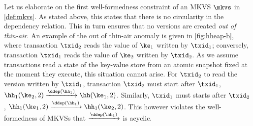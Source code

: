 
Let us elaborate on the first well-formedness constraint of an MKVS \( \mkvs \) in \cref{def:mkvs}. As stated above, this states that there is no circularity in the dependency relation.
This in turn ensures that no versions are created \emph{out of thin-air}.
An example of the out of thin-air anomaly is given in \cref{fig:hheap-b}, where
transaction $\txid_2$ reads the value of $\ke_1$ written by $\txid_1$;
conversely, transaction $\txid_1$ reads the value of $\ke_2$ written by $\txid_2$. 
As we assume transactions read a state of the key-value store from an atomic snapshot fixed at the moment they execute, this situation cannot arise. 
For $\txid_2$ to read the version written by $\txid_1$, transaction $\txid_2$ must start after $\txid_1$, \ie \( \hh_1(\ke_2, 2) \xrightarrow{\ddep(\hh_1)} \hh(\ke_1, 2) \).
Similarly, $\txid_1$ must starts after $\txid_2$, \ie \( \hh_1(\ke_1, 2) \xrightarrow{\ddep(\hh_1)} \hh_1(\ke_2, 2) \).
This however violates the well-formedness of MKVSs that $\xrightarrow{\ddep(\hh_1)}$ is acyclic. 


